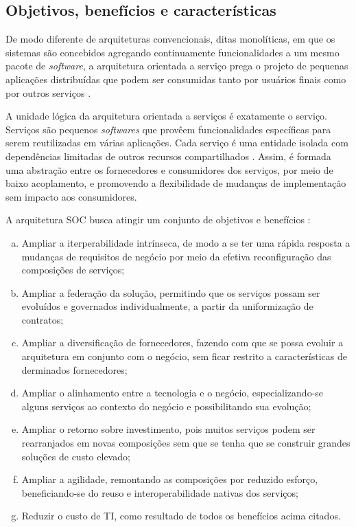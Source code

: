 \subsection{Objetivos, benefícios e características}
\vspace{-6mm}

De modo diferente de arquiteturas convencionais, ditas monolíticas, em que os
sistemas são concebidos agregando continuamente funcionalidades a um mesmo pacote de
\textit{software}, a arquitetura orientada a serviço prega o projeto de pequenas
aplicações distribuídas que podem ser consumidas tanto por usuários finais como
por outros serviços \cite{papazoglou2007serviceApprTechRechIss}. 

A unidade lógica da arquitetura orientada a serviços é exatamente o serviço.
Serviços são pequenos \textit{softwares} que provêem funcionalidades específicas
para serem reutilizadas em várias aplicações. Cada serviço é uma entidade isolada com
dependências limitadas de outros recursos compartilhados
\cite{serrano2014service}. Assim, é formada uma abstração entre os fornecedores
e consumidores dos serviços, por meio de baixo acoplamento, e promovendo a
flexibilidade de mudanças de implementação sem impacto aos consumidores.

A arquitetura SOC busca atingir um conjunto de objetivos e benefícios
\cite{erl2008soaDesigPatterns}:
\begin{enumerate}[(a)] 
  \item Ampliar a iterperabilidade intrínseca, de modo a se ter uma rápida
  resposta a mudanças de requisitos de negócio por meio da efetiva
  reconfiguração das composições de serviços;
  \item Ampliar a federação da solução, permitindo que os serviços possam ser
  evoluídos e governados individualmente, a partir da uniformização de
  contratos;
  \item Ampliar a diversificação de fornecedores, fazendo com que se possa
  evoluir a arquitetura em conjunto com o negócio, sem ficar restrito a
  características de derminados fornecedores;
  \item Ampliar o alinhamento entre a tecnologia e o negócio, especializando-se
  alguns serviços ao contexto do negócio e possibilitando sua evolução;
  \item Ampliar o retorno sobre investimento, pois muitos serviços podem
  ser rearranjados em novas composições sem que se tenha que se construir
  grandes soluções de custo elevado;
  \item Ampliar a agilidade, remontando as composições por reduzido esforço,
  beneficiando-se do reuso e interoperabilidade nativas dos serviços;
  \item Reduzir o custo de TI, como resultado de todos os benefícios acima
  citados.
\end{enumerate}


